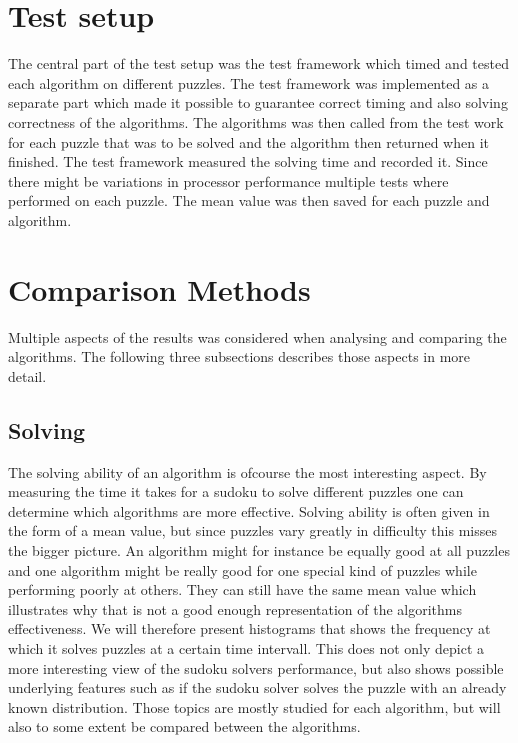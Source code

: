 \documentclass[a4paper,11pt]{kth-mag}
\begin{document}
\FloatBarrier
\section{Test setup}
The central part of the test setup was the test framework which timed and tested each algorithm on different puzzles. 
The test framework was implemented as a separate part which made it possible to guarantee correct timing and also solving correctness of the algorithms.
The algorithms was then called from the test work for each puzzle that was to be solved and the algorithm then returned when it finished.
The test framework measured the solving time and recorded it. 
Since there might be variations in processor performance multiple tests where performed on each puzzle. 
The mean value was then saved for each puzzle and algorithm.

\FloatBarrier
\section{Comparison Methods}
Multiple aspects of the results was considered when analysing and comparing the algorithms. The following three subsections describes those aspects in more detail. 

\FloatBarrier
\subsection{Solving}
The solving ability of an algorithm is ofcourse the most interesting aspect.
By measuring the time it takes for a sudoku to solve different puzzles one
can determine which algorithms are more effective.
Solving ability is often given in the form of a mean value, but since puzzles vary greatly in difficulty this misses the bigger picture.
An algorithm might for instance be equally good at all puzzles and one algorithm might be really good for one special kind of puzzles while performing poorly at others.
They can still have the same mean value which illustrates why that is not a good enough representation of the algorithms effectiveness.
We will therefore present histograms that shows the frequency at which it solves puzzles at a certain time intervall.
This does not only depict a more interesting view of the sudoku solvers performance, but also shows possible underlying features such as if the sudoku solver solves the puzzle with an already known distribution.
Those topics are mostly studied for each algorithm, but will also to some extent be compared between the algorithms.
\end{document}
